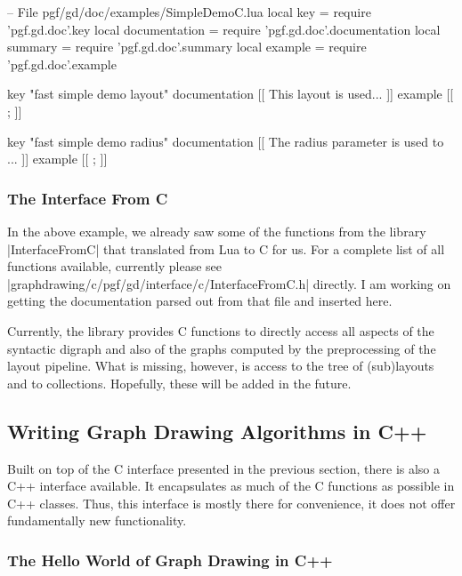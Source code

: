 \begin{codeexample}
-- File pgf/gd/doc/examples/SimpleDemoC.lua
local key           = require 'pgf.gd.doc'.key
local documentation = require 'pgf.gd.doc'.documentation
local summary       = require 'pgf.gd.doc'.summary
local example       = require 'pgf.gd.doc'.example

key           "fast simple demo layout"
documentation 
[[
This layout is used...
]]
example
[[
\tikz {};
]]

key           "fast simple demo radius"
documentation 
[[
The radius parameter is used to ...
]]
example
[[
\tikz {};
]]
\end{codeexample}



\subsubsection{The Interface From C}

In the above example, we already saw some of the functions from the
library |InterfaceFromC| that translated from Lua to C for us. For a
complete list of all functions available, currently please see
|graphdrawing/c/pgf/gd/interface/c/InterfaceFromC.h| directly. I am
working on getting the documentation parsed out from that file and
inserted here.

Currently, the library provides C functions to directly access all
aspects of the syntactic digraph and also of the graphs computed by
the preprocessing of the layout pipeline. What is missing, however, is
access to the tree of (sub)layouts and to collections. Hopefully, these will
be added in the future. 




\subsection{Writing Graph Drawing Algorithms in C++}

\label{section-gd-c++}

Built on top of the C interface presented in the previous section,
there is also a C++ interface available. It encapsulates as much of
the C functions as possible in C++ classes. Thus, this interface is
mostly there for convenience, it does not offer fundamentally new
functionality.


\subsubsection{The Hello World of Graph Drawing in C++}


